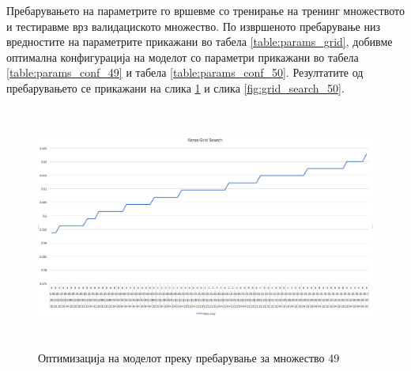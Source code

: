 \begin{table}[hbtp]
 \centering
\caption{Вредности на хипер-параметрите користени за пребарување и оптимизација на моделот}
\label{table:params_grid}
\end{table}

Пребарувањето на параметрите го вршевме со тренирање на тренинг множеството и тестиравме врз валидациското множество. По извршеното пребарување низ вредностите на параметрите прикажани во табела \ref{table:params_grid}, добивме оптимална конфигурација на моделот со параметри прикажани во табела \ref{table:params_conf_49} и табела  \ref{table:params_conf_50}. Резултатите од пребарувањето се прикажани на слика \ref{fig:grid_search_49} и слика  \ref{fig:grid_search_50}.

\begin{figure}[hbtp]
\centering
\includegraphics[width=14cm,height=8cm]{images/keras_grid_search.png}
\caption{Оптимизација на моделот преку пребарување за множество 49}
\label{fig:grid_search_49}
\centering
\end{figure}

